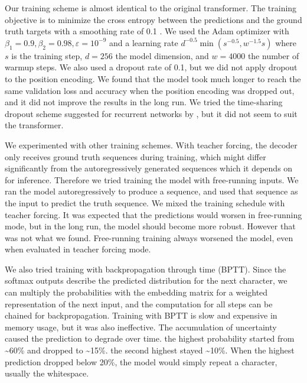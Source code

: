 \documentclass[11pt,twocolumn]{article}
\begin{document}
Our training scheme is almost identical to the original transformer.
The training objective is to minimize the cross entropy between the predictions
and the ground truth targets with a smoothing rate of 0.1 \parencite{szegedy2016rethinking}.
We used the Adam optimizer \parencite{kingma2014adam} with
\(\beta_{1} = 0.9, \beta_{2} = 0.98, \varepsilon = 10^{-9}\)
and a learning rate
\(d^{-0.5} \min \left(s^{-0.5}, w^{-1.5}s\right)\)
where \(s\) is the training step,
\(d = 256\) the model dimension,
and \(w = 4000\) the number of warmup steps.
We also used a dropout rate of 0.1,
but we did not apply dropout to the position encoding.
We found that the model took much longer to reach the same validation loss and accuracy
when the position encoding was dropped out,
and it did not improve the results in the long run.
We tried the time-sharing dropout scheme suggested for recurrent networks
by \textcite{gal2016theoretically},
but it did not seem to suit the transformer.

We experimented with other training schemes.
With teacher forcing, the decoder only receives ground truth sequences during training,
which might differ significantly from the autoregressively generated sequences
which it depends on for inference.
Therefore we tried training the model with free-running inputs.
We ran the model autoregressively to produce a sequence,
and used that sequence as the input to predict the truth sequence.
We mixed the training schedule with teacher forcing.
It was expected that the predictions would worsen in free-running mode,
but in the long run, the model should become more robust.
However that was not what we found.
Free-running training always worsened the model,
even when evaluated in teacher forcing mode.

We also tried training with backpropagation through time (BPTT).
Since the softmax outputs describe the predicted distribution for the next character,
we can multiply the probabilities with the embedding matrix for a weighted representation of the next input,
and the computation for all steps can be chained for backpropagation.
Training with BPTT is slow and expensive in memory usage,
but it was also ineffective.
The accumulation of uncertainty caused the prediction to degrade over time.
the highest probability started from \textasciitilde{}60\% and dropped to \textasciitilde{}15\%.
the second highest stayed \textasciitilde{}10\%.
When the highest prediction dropped below 20\%,
the model would simply repeat a character, usually the whitespace.
\end{document}

